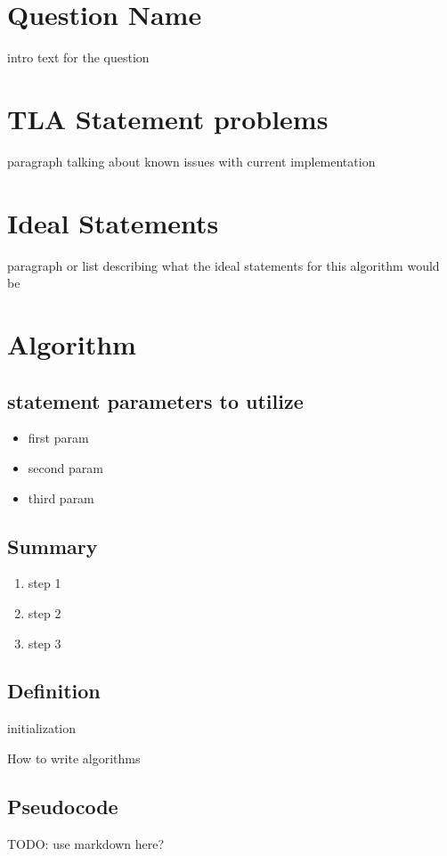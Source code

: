 \documentclass{article}
\begin{document}
\section*{Question Name}
intro text for the question

\section{TLA Statement problems}
paragraph talking about known issues with current implementation

\section{Ideal Statements}
paragraph or list describing what the ideal statements for this algorithm would be
\section{Algorithm}
\subsection{statement parameters to utilize}

\begin{itemize}
  \item first param
  \item second param
  \item third param
  \end{itemize}
\subsection{Summary}
\begin{enumerate}
  \item step 1
  \item step 2
  \item step 3
  \end{enumerate}

  \subsection{Definition}
  \begin{algorithm}[H]
    \SetAlgoLined
    initialization\;
    \caption{How to write algorithms}
  \end{algorithm}

  \subsection{Pseudocode}
  TODO: use markdown here?
\end{document}
